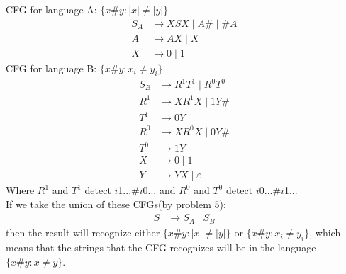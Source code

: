 \documentclass{article}
\begin{document}
\begin{enumerate}[label=\alph*.]
	CFG for language A: $\{x\#y: |x| \neq  |y|\}$
	\begin{align*}
	S_A &\rightarrow XSX \mid A\# \mid \#A\\
	A &\rightarrow AX \mid X\\
	X &\rightarrow 0 \mid 1
	\end{align*}
	CFG for language B: $\{x\#y: x_i \neq y_i\}$
	\begin{align*}
	S_B &\rightarrow R^1T^1 \mid R^0T^0\\
	R^1 &\rightarrow XR^1X \mid 1Y\#\\
	T^1 &\rightarrow 0Y\\
	R^0 &\rightarrow XR^0X \mid 0Y\#\\
	T^0 &\rightarrow 1Y\\
	X &\rightarrow 0 \mid 1\\
	Y &\rightarrow YX \mid \varepsilon
	\end{align*}
	Where $R^1$ and $T^1$ detect $i$1...\#$i$0... and $R^0$ and $T^0$ detect $i$0...\#$i$1...\\
	If we take the union of these CFGs(by problem 5):
	\begin{align*}
	S &\rightarrow S_A \mid S_B
	\end{align*}
	then the result will recognize either $\{x\#y: |x| \neq  |y|\}$ or $\{x\#y: x_i \neq y_i\}$, which means that the strings that the CFG recognizes will be in the language $\{x\#y : x \neq y\}$.
\end{enumerate}
\end{document}
